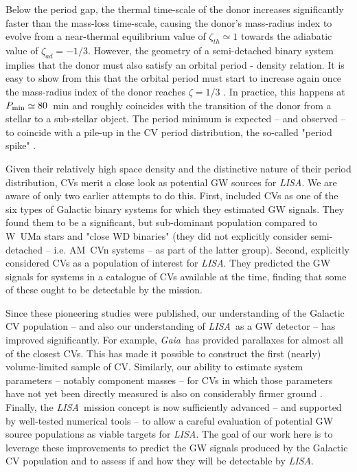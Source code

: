 \documentclass[fleqn,usenatbib]{mnras}
\newcommand{\lisa}{{\it LISA}}
\newcommand{\gaia}{{\it Gaia}}
\begin{document}
Below the period gap, the thermal time-scale of the donor increases significantly faster than the mass-loss time-scale, causing the donor's mass-radius index to evolve from a near-thermal equilibrium value of  $\zeta_{th} \simeq 1$ towards the adiabatic value of $\zeta_{ad} = -1/3$. However, the geometry of a semi-detached binary system implies that the donor must also satisfy an orbital period - density relation. It is easy to show from this that the orbital period must start to increase again once the mass-radius index of the donor reaches $\zeta = 1/3$ \citep[see e.g.][]{knigge11}. In practice, this happens at $P_{\rm{min}} \simeq 80$~min and roughly coincides with the transition of the donor from a stellar to a sub-stellar object. The period minimum is expected -- and observed -- to coincide with a pile-up in the CV period distribution, the so-called "period spike" \citep[][]{gansicke09}.

Given their relatively high space density and the distinctive nature of their period distribution, CVs merit a close look as potential GW sources for \lisa. We are aware of only two earlier attempts to do this. First, \cite{HBW90} included CVs as one of the six types of Galactic binary systems for which they estimated GW signals. They found them to be a significant, but sub-dominant population compared to W~UMa stars and "close WD binaries" (they did not explicitly consider semi-detached -- i.e. AM~CVn systems -- as part of the latter group). Second, \cite{MAA00} explicitly considered CVs as a population of interest for \lisa. They predicted the GW signals for systems in a catalogue of CVs available at the time, finding that some of these ought to be detectable by the mission. 

Since these pioneering studies were published, our understanding of the Galactic CV population -- and also our understanding of \lisa\ as a GW detector -- has improved significantly. For example, \gaia\ has provided parallaxes for almost all of the closest CVs. This has made it possible to construct the first (nearly) volume-limited sample of CV. Similarly, our ability to estimate system parameters -- notably component masses -- for CVs in which those parameters have not yet been directly measured is also on considerably firmer ground \citep{knigge06,knigge11,savoury11,carter13}. Finally, the \lisa\ mission concept is now sufficiently advanced -- and supported by well-tested numerical tools -- to allow a careful evaluation of potential GW source populations as viable targets for \lisa \citep[e.g.][]{PhysRevD.107.063004,LEGWORK_joss,LEGWORK_apjs}. The goal of our work here is to leverage these improvements to predict the GW signals produced by the Galactic CV population and to assess if and how they will be detectable by \lisa.
\end{document}
